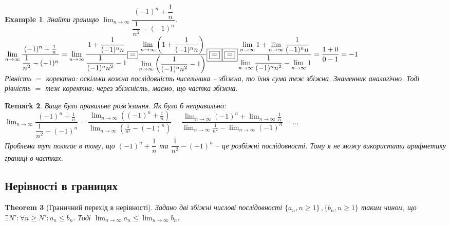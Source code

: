 \documentclass[a4paper, 14pt]{article}
\theoremstyle{theoremdd}
\newtheorem{theorem}{Theorem}[subsection]
\theoremstyle{theoremdd}
\theoremstyle{theoremdd}
\theoremstyle{theoremdd}
\newtheorem{example}[theorem]{Example}
\theoremstyle{theoremdd}
\theoremstyle{theoremdd}
\newtheorem{remark}[theorem]{Remark}
\theoremstyle{theoremdd}
\theoremstyle{theoremdd}
\begin{document}
	\begin{example}
	Знайти границю $\displaystyle \lim_{n \to \infty} \dfrac{(-1)^n + \dfrac{1}{n}}{\dfrac{1}{n^2}- (-1)^n}$.\\
	$\displaystyle \lim_{n \to \infty} \dfrac{(-1)^n + \frac{1}{n}}{\dfrac{1}{n^2}- (-1)^n} = \lim_{n \to \infty} \dfrac{1 + \dfrac{1}{(-1)^n n}}{\dfrac{1}{(-1)^n n^2} - 1} \boxed{=} \dfrac{\displaystyle\lim_{n \to \infty} \left( 1 + \dfrac{1}{(-1)^n n} \right)}{\displaystyle\lim_{n \to \infty} \left( \dfrac{1}{(-1)^n n^2} - 1 \right)} \boxed{\boxed{=}}
	\\ \boxed{\boxed{=}} \dfrac{\displaystyle\lim_{n \to \infty} 1 + \lim_{n \to \infty} \dfrac{1}{(-1)^n n}}{\displaystyle\lim_{n \to \infty} \dfrac{1}{(-1)^n n^2} - \lim_{n \to \infty} 1 } = \dfrac{1+0}{0-1} = -1$\\
	Рівність $\boxed{\boxed{=}}$ коректна: оскільки кожна послідовність чисельника -- збіжна, то їхня сума теж збіжна. Знаменник аналогічно. Тоді рівність $\boxed{=}$ теж коректна: через збіжність, маємо, що частка збіжна.
	\end{example}
	
	\begin{remark}
	Вище було правильне розв'язання. Як було б неправильно: \\
	$\displaystyle \lim_{n \to \infty} \dfrac{(-1)^n + \frac{1}{n}}{\dfrac{1}{n^2}- (-1)^n} = \dfrac{\displaystyle \lim_{n \to \infty} \left( (-1)^n + \frac{1}{n} \right) }{\displaystyle \lim_{n \to \infty} \left( \frac{1}{n^2} - (-1)^n \right)} = \dfrac{\displaystyle \lim_{n \to \infty} (-1)^n + \lim_{n \to \infty} \frac{1}{n} }{\displaystyle \lim_{n \to \infty} \frac{1}{n^2} - \lim_{n \to \infty} (-1)^n} = \dots$\\
	Проблема тут полягає в тому, що $(-1)^n + \dfrac{1}{n}$ та $\dfrac{1}{n^2}-(-1)^n$ -- це розбіжні послідовності. Тому я не можу використати арифметику границі в частках.\\
	\end{remark}
	
	\subsection{Нерівності в границях}
	\begin{theorem}[Граничний перехід в нерівності]
	Задано дві збіжні числові послідовності $\{a_n, n \geq 1\} \,, \{b_n, n \geq 1\}$ таким чином, що $\exists N': \forall n \geq N': a_n \leq b_n$. Тоді $\displaystyle \lim_{n \to \infty} a_n \leq \lim_{n \to \infty} b_n$.
	\end{theorem}
	
\end{document}
